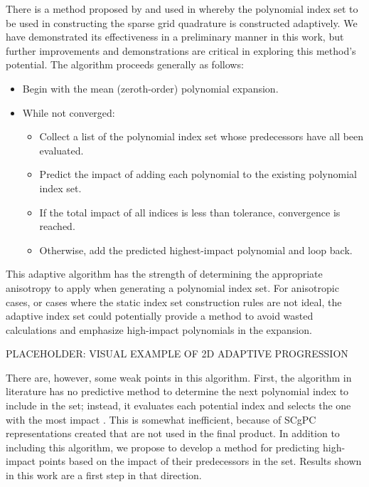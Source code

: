There is a method proposed by \cite{Gerstner} and used in \cite{Ayres} whereby the polynomial index set to be
used in constructing the sparse grid quadrature is constructed adaptively.  We have demonstrated its
effectiveness in a preliminary manner in this work, but further improvements and demonstrations are critical
in exploring this method's potential.  The algorithm proceeds generally
as follows:
\begin{itemize}
  \item Begin with the mean (zeroth-order) polynomial expansion.
  \item While not converged:
    \begin{itemize}
      \item Collect a list of the polynomial index set whose predecessors have all been evaluated.
      \item Predict the impact of adding each polynomial to the existing polynomial index set.
      \item If the total impact of all indices is less than tolerance, convergence is reached.
      \item Otherwise, add the predicted highest-impact polynomial and loop back.
    \end{itemize}
\end{itemize}
This adaptive algorithm has the strength of determining the appropriate anisotropy to apply when generating a
polynomial index set.  For anisotropic cases, or cases where the static index set construction rules are not
ideal, the adaptive index set could potentially provide a method to avoid wasted calculations and emphasize
high-impact polynomials in the expansion.

PLACEHOLDER: VISUAL EXAMPLE OF 2D ADAPTIVE PROGRESSION

There are, however, some weak points in this algorithm.  First, the algorithm in literature has no predictive method
to determine the next polynomial index to include in the set; instead, it evaluates each potential index and
selects the one with the most impact \cite{Ayres}.  This is somewhat inefficient, because of SCgPC representations created
that are not used in the final product.  In addition to including this algorithm, we propose to develop a
method for predicting high-impact points based on the impact of their predecessors in the set.  Results shown
in this work are a first step in that direction.

